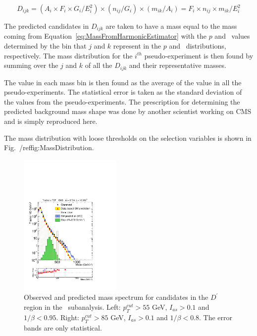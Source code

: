 \begin{equation}
D_{ijk} = (A_i \times F_i \times G_i / E_{i}^{2}) \times (n_{ij}/G_i) \times (m_{ik}/A_i) = F_i \times n_{ij} \times m_{ik} / E_{i}^{2}
\label{eq:MassPrediction}
\end{equation}

The predicted candidates in $D_{ijk}$ are taken to have a mass equal to the mass coming from Equation~\ref{eq:MassFromHarmonicEstimator} with the $p$ and \ih\ values
determined by the bin that $j$ and $k$ represent in the $p$ and \ih\ distributions, respectively. The mass distribution for the $i^{th}$ pseudo-experiment is then
found by summing over the $j$ and $k$ of all the $D_{ijk}$ and their representative masses. 

The value in each mass bin is then found as the average of the value in all the pseudo-experiments. The statistical error is taken as the standard deviation of the values from
the pseudo-experiments. The prescription for determining the predicted background mass shape was done by another scientist working on CMS and is simply reproduced here.

The mass distribution with loose thresholds on the selection variables is shown in Fig.~/ref{fig:MassDistribution}.

\begin{figure}
 \begin{center}
  \includegraphics[clip=true, trim=0.0cm 0cm 2.8cm 0cm,width=0.44\textwidth]{figures/tkmu/Rescale_Mass_8TeV_Loose}
 \end{center}
 \caption{Observed and predicted mass spectrum for candidates in the $D^\prime$ region in the \tktof\ subanalysis.
Left: $p_T^{cut}>55$ GeV, $I_{as}>0.1$ and $1/\beta<0.95$.
Right: $p_T^{cut}>85$ GeV, $I_{as}>0.1$ and $1/\beta<0.8$.
The error bands are only statistical.
\label{fig:MassDistribution}}
\end{figure}

